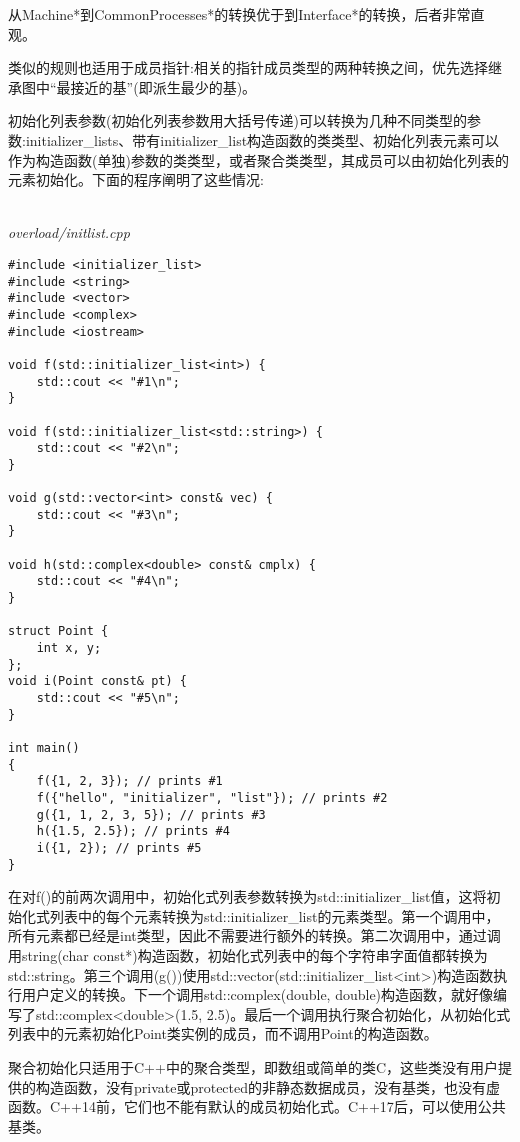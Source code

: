 从Machine*到CommonProcesses*的转换优于到Interface*的转换，后者非常直观。

类似的规则也适用于成员指针:相关的指针成员类型的两种转换之间，优先选择继承图中“最接近的基”(即派生最少的基)。


初始化列表参数(初始化列表参数用大括号传递)可以转换为几种不同类型的参数:initializer\_lists、带有initializer\_list构造函数的类类型、初始化列表元素可以作为构造函数(单独)参数的类类型，或者聚合类类型，其成员可以由初始化列表的元素初始化。下面的程序阐明了这些情况:

\hspace*{\fill} \\ %
\noindent
\textit{overload/initlist.cpp}
\begin{lstlisting}[style=styleCXX]
#include <initializer_list>
#include <string>
#include <vector>
#include <complex>
#include <iostream>

void f(std::initializer_list<int>) {
	std::cout << "#1\n";
}

void f(std::initializer_list<std::string>) {
	std::cout << "#2\n";
}

void g(std::vector<int> const& vec) {
	std::cout << "#3\n";
}

void h(std::complex<double> const& cmplx) {
	std::cout << "#4\n";
}

struct Point {
	int x, y;
};
void i(Point const& pt) {
	std::cout << "#5\n";
}

int main()
{
	f({1, 2, 3}); // prints #1
	f({"hello", "initializer", "list"}); // prints #2
	g({1, 1, 2, 3, 5}); // prints #3
	h({1.5, 2.5}); // prints #4
	i({1, 2}); // prints #5
}	
\end{lstlisting}

在对f()的前两次调用中，初始化式列表参数转换为std::initializer\_list值，这将初始化式列表中的每个元素转换为std::initializer\_list的元素类型。第一个调用中，所有元素都已经是int类型，因此不需要进行额外的转换。第二次调用中，通过调用string(char const*)构造函数，初始化式列表中的每个字符串字面值都转换为std::string。第三个调用(g())使用std::vector(std::initializer\_list<int>)构造函数执行用户定义的转换。下一个调用std::complex(double, double)构造函数，就好像编写了std::complex<double>(1.5, 2.5)。最后一个调用执行聚合初始化，从初始化式列表中的元素初始化Point类实例的成员，而不调用Point的构造函数。

\begin{tcolorbox}[colback=webgreen!5!white,colframe=webgreen!75!black]
\hspace*{0.75cm}聚合初始化只适用于C++中的聚合类型，即数组或简单的类C，这些类没有用户提供的构造函数，没有private或protected的非静态数据成员，没有基类，也没有虚函数。C++14前，它们也不能有默认的成员初始化式。C++17后，可以使用公共基类。
\end{tcolorbox}

